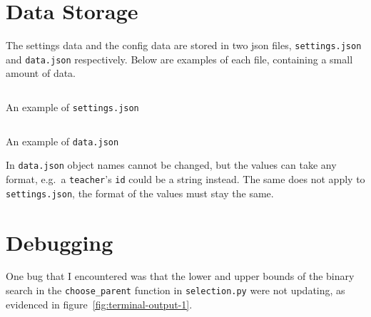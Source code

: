 \documentclass[a4paper, 12pt]{report}
\begin{document}
\section{Data Storage}

The settings data and the config data are stored in two json files, 
\verb|settings.json| and \verb|data.json| respectively.
Below are examples of each file, containing a small amount of data.

\inputminted[linenos, fontsize=\footnotesize]{json}{code/settings_template.json}

\begin{center}
	\small{An example of \verb|settings.json|}
\end{center}

\inputminted[linenos, fontsize=\footnotesize]{json}{code/data_template.json}

\begin{center}
	\small{An example of \verb|data.json|}
\end{center}

In \verb|data.json| object names cannot be changed, but the values can take any 
format, e.g.\ a \verb|teacher|'s \verb|id| could be a string instead.
The same does not apply to \verb|settings.json|, the format of the values must 
stay the same.

\newpage

\section{Debugging}

One bug that I encountered was that the lower and upper bounds of the binary 
search in the \verb|choose_parent| function in \verb|selection.py| were not
updating, as evidenced in figure~\ref*{fig:terminal-output-1}.
\end{document}
